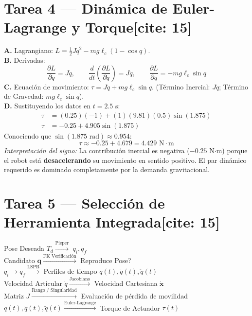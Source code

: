 \documentclass[11pt, a4paper]{article}
\begin{document}
\section*{Tarea 4 — Dinámica de Euler-Lagrange y Torque[cite: 15]}
\textbf{A.} Lagrangiano: $L = \frac{1}{2}J\dot{q}^2 - mg\ell_c(1-\cos q)$.\\
\textbf{B.} Derivadas:
\begin{equation*}
    \frac{\partial L}{\partial \dot{q}} = J\dot{q}, \qquad \frac{d}{dt}\left(\frac{\partial L}{\partial \dot{q}}\right) = J\ddot{q}, \qquad \frac{\partial L}{\partial q} = -mg\ell_c\sin q
\end{equation*}
\textbf{C.} Ecuación de movimiento: $\tau = J\ddot{q} + mg\ell_c\sin q$. (Término Inercial: $J\ddot{q}$; Término de Gravedad: $mg\ell_c\sin q$).\\
\textbf{D.} Sustituyendo los datos en $t=2.5$ s:
\begin{align*}
    \tau &= (0.25)(-1) + (1)(9.81)(0.5)\sin(1.875) \\
    \tau &= -0.25 + 4.905\sin(1.875)
\end{align*}
Conociendo que $\sin(1.875\text{ rad}) \approx 0.954$:
\begin{equation*}
    \tau \approx -0.25 + 4.679 = 4.429 \text{ N}\cdot\text{m}
\end{equation*}
\textit{Interpretación del signo:} La contribución inercial es negativa ($-0.25$ N$\cdot$m) porque el robot está \textbf{desacelerando} su movimiento en sentido positivo. El par dinámico requerido es dominado completamente por la demanda gravitacional.

\section*{Tarea 5 — Selección de Herramienta Integrada[cite: 15]}
\begin{center}
    Pose Deseada $T_d \xrightarrow{\text{Pieper}}$ $q_i, q_f$ \\
    Candidato $\mathbf{q} \xrightarrow{\text{FK Verificación}}$ Reproduce Pose? \\
    $q_i \to q_f \xrightarrow{\text{LSPB}}$ Perfiles de tiempo $q(t), \dot{q}(t), \ddot{q}(t)$ \\
    Velocidad Articular $\dot{q} \xrightarrow{\text{Jacobiano}}$ Velocidad Cartesiana $\dot{\mathbf{x}}$ \\
    Matriz $J \xrightarrow{\text{Rango / Singularidad}}$ Evaluación de pérdida de movilidad \\
    $q(t), \dot{q}(t), \ddot{q}(t) \xrightarrow{\text{Euler-Lagrange}}$ Torque de Actuador $\tau(t)$
\end{center}
\end{document}

